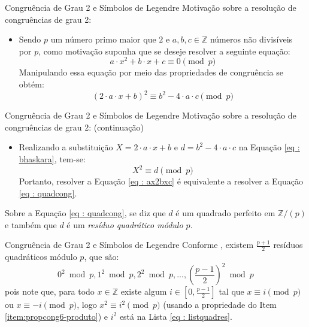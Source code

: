 \begin{frame}[fragile]{Congruência de Grau 2 e Símbolos de Legendre}
    Motivação sobre a resolução de congruências de grau 2:
    \vspace{4mm}
    \begin{itemize}
        \item Sendo $p$ um número primo maior que $2$ e $a,b,c \in \mathbb{Z}$ números não divisíveis por $p$, como motivação suponha que se deseje resolver a seguinte equação:
        \begin{equation} \label{eq : ax2bxc}
            a \cdot x^2 + b \cdot x + c \equiv 0 \pmod p
        \end{equation}
        Manipulando essa equação por meio das propriedades de congruência se obtém:
        \begin{equation} \label{eq : bhaskara}
            (2 \cdot a \cdot x + b)^2 \equiv b^2 - 4 \cdot a \cdot c \pmod p
        \end{equation}
    \end{itemize}
\end{frame}

\begin{frame}[fragile]{Congruência de Grau 2 e Símbolos de Legendre}
    Motivação sobre a resolução de congruências de grau 2: 
    (continuação)
    \vspace{4mm}
    \begin{itemize}
        \item Realizando a substituição $X = 2 \cdot a \cdot x + b$ e $d = b^2 - 4 \cdot a \cdot c$ na Equação \ref{eq : bhaskara}, tem-se:
        \begin{equation} \label{eq : quadcong}
            X^2 \equiv d \pmod p
        \end{equation}
        Portanto, resolver a Equação \ref{eq : ax2bxc} é equivalente a resolver a Equação \ref{eq : quadcong}.
    \end{itemize}
    \vspace{4mm}
    Sobre a Equação \ref{eq : quadcong}, se diz que $d$ é um quadrado perfeito em $\mathbb{Z}/(p)$ e também que $d$ é um \textit{resíduo quadrático módulo $p$}.

\end{frame}

\begin{frame}[fragile]{Congruência de Grau 2 e Símbolos de Legendre}
    Conforme \cite{book:2399854}, existem $\frac{p+1}{2}$ resíduos quadráticos módulo $p$, que são:
        \begin{equation} \label{eq : listquadres}
            0^2 \bmod{p}, 1^2 \bmod{p}, 2^2 \bmod{p}, ..., \left(\frac{p -1}{2} \right)^2 \bmod{p} 
        \end{equation}
    pois note que, para todo $x \in \mathbb{Z}$ existe algum $i \in [0, \frac{p-1}{2}]$ tal que $x \equiv i \pmod{p}$ ou $x \equiv -i \pmod{p}$, logo $x^2 \equiv i^2 \pmod{p}$ (usando a propriedade do Item \ref{item:propcong6-produto}) e $i^2$ está na Lista \ref{eq : listquadres}.
\end{frame}

